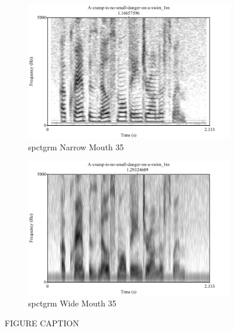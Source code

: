 \documentclass[dissertation,copyright]{uathesis}
\begin{document}
\begin{figure}
\centering
\begin{subfigure}{.5\textwidth}
  \centering
  \includegraphics[width=1\linewidth]{figure/spctgrmNarrowMouth_35.pdf}
  \caption{spctgrm Narrow Mouth 35}
  \label{spctgrmNarrowMouth_35}
\end{subfigure}%
\hfill
\begin{subfigure}{.5\textwidth}
  \centering
  \includegraphics[width=1\linewidth]{figure/spctgrmWideMouth_35.pdf}
  \caption{spctgrm Wide Mouth 35}
  \label{spctgrmWideMouth_35}
\end{subfigure}
\caption{FIGURE CAPTION}
\label{fig:spect_mouth}
\end{figure}
\end{document}
